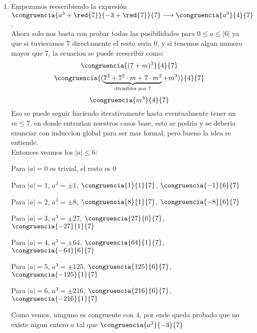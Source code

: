\begin{enumerate}[label=\alph*)]
  \item Empezamos reescribiendo la expresión $\congruencia{a^3 + \red{7}}{-3 +\red{7}}{7} \longrightarrow \congruencia{a^3}{4}{7}$. \\
  Ahora solo nos basta con probar todas las posibilidades para $ 0 \leq a \leq |6|$ ya que si tuvieramos $7$
  directamente el resto seria 0, y si tenemos algun numero mayor que $7$, la ecuacion se puede reescribir como:
  \[\congruencia{(7+m)^3}{4}{7}\]
  \[\congruencia{(\underbrace{7^3+7^2\cdot m + 7\cdot m^2}_{\text{divisibles por 7}} + m^3)}{4}{7}\]
  \[\congruencia{m^3}{4}{7}\]
  Eso se puede seguir haciendo iterativamente hasta eventualmente tener un $m \leq 7$, en donde entrarian nuestros casos base, 
  esto se podria y se deberia enunciar con induccion global para ser mas formal, pero bueno la idea se entiende. \\ 
  Entonces veamos los $|a|\leq 6$:\\
  \begin{center}
  Para $|a| = 0$ es trivial, el resto es 0\par
  Para $|a| = 1$, $a^3 = \pm 1$, $\congruencia{1}{1}{7}$, $\congruencia{-1}{6}{7}$\par
  Para $|a| = 2$, $a^3 = \pm 8$, $\congruencia{8}{1}{7}$, $\congruencia{-8}{6}{7}$\par
  Para $|a| = 3$, $a^3 = \pm 27$, $\congruencia{27}{6}{7}$, $\congruencia{-27}{1}{7}$\par
  Para $|a| = 4$, $a^3 = \pm 64$, $\congruencia{64}{1}{7}$, $\congruencia{-64}{6}{7}$\par
  Para $|a| = 5$, $a^3 = \pm 125$, $\congruencia{125}{6}{7}$, $\congruencia{-125}{1}{7}$\par
  Para $|a| = 6$, $a^3 = \pm 216$, $\congruencia{216}{6}{7}$, $\congruencia{-216}{1}{7}$\par
  \end{center}
  Como vemos, ninguno es congruente con 4, por ende queda probado que no existe nigun entero $a$ 
  tal que $\congruencia{a^3}{-3}{7}$


\end{enumerate}
